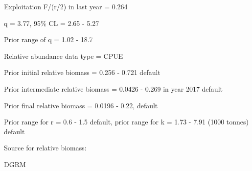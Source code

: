 \documentclass[12pt,a4paper]{article}\usepackage[]{graphicx}\usepackage[]{xcolor}
\begin{document}
Exploitation F/(r/2) in last year = 0.264

q = 3.77, 95\% CL = 2.65 - 5.27

Prior range of q = 1.02 - 18.7

Relative abundance data type = CPUE

Prior initial relative biomass = 0.256 - 0.721 default

Prior intermediate relative biomass = 0.0426 - 0.269 in year 2017 default

Prior final relative biomass = 0.0196 - 0.22, default

Prior range for r = 0.6 - 1.5 default, prior range for k = 1.73 - 7.91 (1000 tonnes) default

Source for relative biomass: 

DGRM

    
\end{document}
